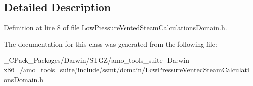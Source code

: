 \subsection{Detailed Description}


Definition at line 8 of file Low\+Pressure\+Vented\+Steam\+Calculations\+Domain.\+h.



The documentation for this class was generated from the following file\+:\begin{DoxyCompactItemize}
\item 
\+\_\+\+C\+Pack\+\_\+\+Packages/\+Darwin/\+S\+T\+G\+Z/amo\+\_\+tools\+\_\+suite-\/-\/\+Darwin-\/x86\+\_/amo\+\_\+tools\+\_\+suite/include/ssmt/domain/Low\+Pressure\+Vented\+Steam\+Calculations\+Domain.\+h\end{DoxyCompactItemize}
